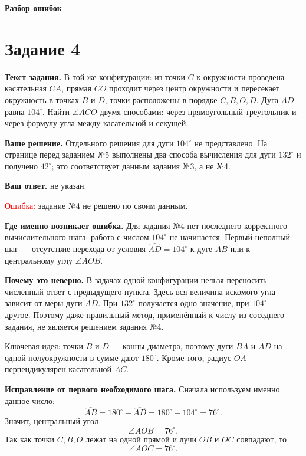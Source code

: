 \documentclass[12pt,a4paper]{article}
\newcommand{\errlabel}[1]{\textcolor{red}{Ошибка:} #1}
\newcommand{\keyidea}[1]{\textcolor{blue!60!black}{Ключевая идея:} #1}
\begin{document}
\newpage
\vspace*{\fill}
\begin{center}
{\LARGE\bfseries Разбор ошибок}
\end{center}
\vspace*{\fill}

\newpage
{}\label{task:4}
\section*{Задание 4}

\textbf{Текст задания.} В той же конфигурации: из точки $C$ к окружности проведена касательная $CA$, прямая $CO$ проходит через центр окружности и пересекает окружность в точках $B$ и $D$, точки расположены в порядке $C,B,O,D$. Дуга $AD$ равна $104^\circ$. Найти $\angle ACO$ двумя способами: через прямоугольный треугольник и через формулу угла между касательной и секущей.

\textbf{Ваше решение.} Отдельного решения для дуги $104^\circ$ не представлено. На странице перед заданием №5 выполнены два способа вычисления для дуги $132^\circ$ и получено $42^\circ$; это соответствует данным задания №3, а не №4.

\textbf{Ваш ответ.} не указан.

\errlabel{задание №4 не решено по своим данным.}

\textbf{Где именно возникает ошибка.} Для задания №4 нет последнего корректного вычислительного шага: работа с числом $104^\circ$ не начинается. Первый неполный шаг --- отсутствие перехода от условия $\widehat{AD}=104^\circ$ к дуге $AB$ или к центральному углу $\angle AOB$.

\textbf{Почему это неверно.} В задачах одной конфигурации нельзя переносить численный ответ с предыдущего пункта. Здесь вся величина искомого угла зависит от меры дуги $AD$. При $132^\circ$ получается одно значение, при $104^\circ$ --- другое. Поэтому даже правильный метод, применённый к числу из соседнего задания, не является решением задания №4.

\keyidea{точки $B$ и $D$ --- концы диаметра, поэтому дуги $BA$ и $AD$ на одной полуокружности в сумме дают $180^\circ$. Кроме того, радиус $OA$ перпендикулярен касательной $AC$.}

\textbf{Исправление от первого необходимого шага.} Сначала используем именно данное число:
\[
\widehat{AB}=180^\circ-\widehat{AD}=180^\circ-104^\circ=76^\circ.
\]
Значит, центральный угол
\[
\angle AOB=76^\circ.
\]
Так как точки $C,B,O$ лежат на одной прямой и лучи $OB$ и $OC$ совпадают, то
\[
\angle AOC=76^\circ.
\]
\end{document}
